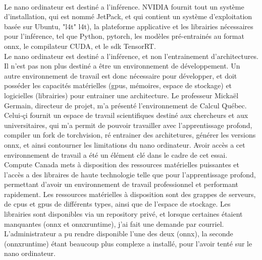 ﻿
\vspace{\baselineskip}
\\
\noindent Le nano ordinateur est destiné a l'inférence. NVIDIA fournit tout un système d'installation, qui est nommé JetPack, et qui contient un système d'exploitation basée sur Ubuntu, "\acrlong{l4t}" \acrshort{l4t}), la plateforme applicative et les librairies nécessaires pour l'inférence, tel que Python, pytorch, les modèles pré-entrainés au format \acrshort{onnx}, le compilateur CUDA, et le \acrshort{sdk} TensorRT.
\vspace{\baselineskip}
\\
\noindent Le nano ordinateur est destiné a l'inférence, et non l'entrainement d'architectures. Il n'est pas non plus destiné a être un environnement de développement. Un autre environnement de travail est donc nécessaire pour développer, et doit posséder les capacités matérielles (\acrshort{gpu}s, mémoires, espace de stockage) et logicielles (librairies) pour entrainer une architecture. Le professeur Mickaël Germain, directeur de projet, m'a présenté l'environnement de Calcul Québec. Celui-çi fournit un espace de travail scientifiques destiné aux chercheurs et aux universitaires, qui m'a permit  de pouvoir travailler avec l'apprentissage profond, compiler un fork de torchvision, ré entrainer des architetures, générer les versions \acrshort{onnx}, et ainsi contourner les limitations du nano ordinateur. Avoir accès a cet environnement de travail a été un élément clé dans le cadre de cet essai.
\vspace{\baselineskip}
\\
\noindent Compute Canada mets à disposition des ressources matérielles puissantes et l'accès a des libraires de haute technologie telle que pour l'apprentissage profond, permettant d'avoir un environnement de travail professionnel et performant rapidement. Les ressources matérielles à disposition sont des grappes de serveurs, de \acrshort{cpu}s et \acrshort{gpu}s de différents types, ainsi que de l'espace de stockage. Les librairies sont disponibles via un repository privé, et lorsque certaines étaient manquantes (\acrshort{onnx} et onnxruntime), j'ai fait une demande par courriel. L'administrateur a pu rendre disponible l'une des deux (\acrshort{onnx}), la seconde (onnxruntime) étant beaucoup plus complexe a installé, pour l'avoir tenté sur le nano ordinateur. 
\vspace{\baselineskip}
\\
